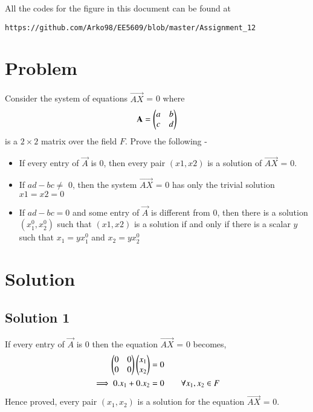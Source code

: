 \documentclass[journal,12pt,twocolumn]{IEEEtran}
\begin{document}
All the codes for the figure in this document can be found at
\begin{lstlisting}
https://github.com/Arko98/EE5609/blob/master/Assignment_12
\end{lstlisting}

\section{\textbf{Problem}}
Consider the system of equations $\vec{AX}$ = 0 where
\begin{align*}
    \mathbf{A} = \begin{pmatrix}a&b\\c&d\end{pmatrix}
\end{align*}
is a $2\times2$ matrix over the field $F$. Prove the following - 
\begin{itemize}
    \item If every entry of $\vec{A}$ is 0, then every pair $(x1, x2)$ is a solution of $\vec{AX}$ = 0.
    \item If $ad - bc \not=$ 0, then the system $\vec{AX}$ = 0 has only the trivial solution $x1 = x2 = 0$
    \item If $ad - bc = 0$ and some entry of $\vec{A}$ is different from 0, then there is a solution $(x_1^0,x_2^0)$ such that $(x1, x2)$ is a solution if and only if there is a scalar $y$ such that $x_1 = yx_1^0$ and $x_2 = yx_2^0$
\end{itemize}
\section{\textbf{Solution}}
\subsection{Solution 1}
If every entry of $\vec{A}$ is 0 then the equation $\vec{AX}$ = 0 becomes,
\begin{align}
\begin{pmatrix}0&0\\0&0\end{pmatrix}\begin{pmatrix}x_1\\x_2\end{pmatrix} &=0\\
\implies0.x_1+0.x_2 &= 0 \qquad{\text{$\forall x_1,x_2 \in F$}}
\end{align}
Hence proved, every pair $(x_1,x_2)$ is a solution for the equation $\vec{AX}$ = 0.
\end{document}
